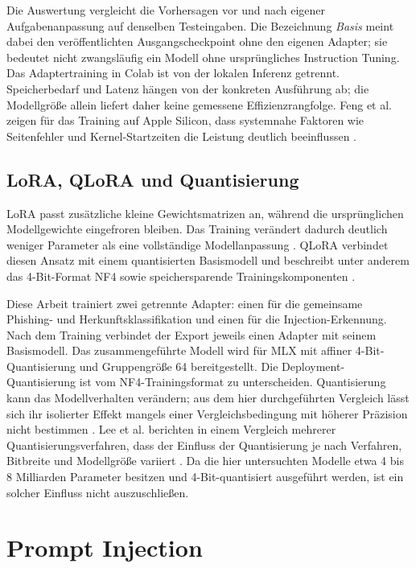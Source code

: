 \documentclass[12pt,twoside=false,a4paper,parskip]{scrbook}
\begin{document}
Die Auswertung vergleicht die Vorhersagen vor und nach eigener Aufgabenanpassung auf denselben Testeingaben. Die Bezeichnung \emph{Basis} meint dabei den veröffentlichten Ausgangscheckpoint ohne den eigenen Adapter; sie bedeutet nicht zwangsläufig ein Modell ohne ursprüngliches Instruction Tuning. Das Adaptertraining in Colab ist von der lokalen Inferenz getrennt. Speicherbedarf und Latenz hängen von der konkreten Ausführung ab; die Modellgröße allein liefert daher keine gemessene Effizienzrangfolge. Feng et al. zeigen für das Training auf Apple Silicon, dass systemnahe Faktoren wie Seitenfehler und Kernel-Startzeiten die Leistung deutlich beeinflussen \cite{feng2025apple}.

\subsection{LoRA, QLoRA und Quantisierung}\label{sec:lora-abwehr}\label{sec:quantisierung}

LoRA passt zusätzliche kleine Gewichtsmatrizen an, während die ursprünglichen Modellgewichte eingefroren bleiben. Das Training verändert dadurch deutlich weniger Parameter als eine vollständige Modellanpassung \cite{hu2021lora}. QLoRA verbindet diesen Ansatz mit einem quantisierten Basismodell und beschreibt unter anderem das 4-Bit-Format NF4 sowie speichersparende Trainingskomponenten \cite{dettmers2023qlora}.

Diese Arbeit trainiert zwei getrennte Adapter: einen für die gemeinsame Phishing- und Herkunftsklassifikation und einen für die Injection-Erkennung. Nach dem Training verbindet der Export jeweils einen Adapter mit seinem Basismodell. Das zusammengeführte Modell wird für MLX mit affiner 4-Bit-Quantisierung und Gruppengröße 64 bereitgestellt. Die Deployment-Quantisierung ist vom NF4-Trainingsformat zu unterscheiden. Quantisierung kann das Modellverhalten verändern; aus dem hier durchgeführten Vergleich lässt sich ihr isolierter Effekt mangels einer Vergleichsbedingung mit höherer Präzision nicht bestimmen \cite{dettmers2023qlora,frantar2022gptq}. Lee et al. berichten in einem Vergleich mehrerer Quantisierungsverfahren, dass der Einfluss der Quantisierung je nach Verfahren, Bitbreite und Modellgröße variiert \cite{lee2024quantization}. Da die hier untersuchten Modelle etwa 4 bis 8 Milliarden Parameter besitzen und 4-Bit-quantisiert ausgeführt werden, ist ein solcher Einfluss nicht auszuschließen.

\section{Prompt Injection}\label{sec:prompt-injection}
\end{document}
